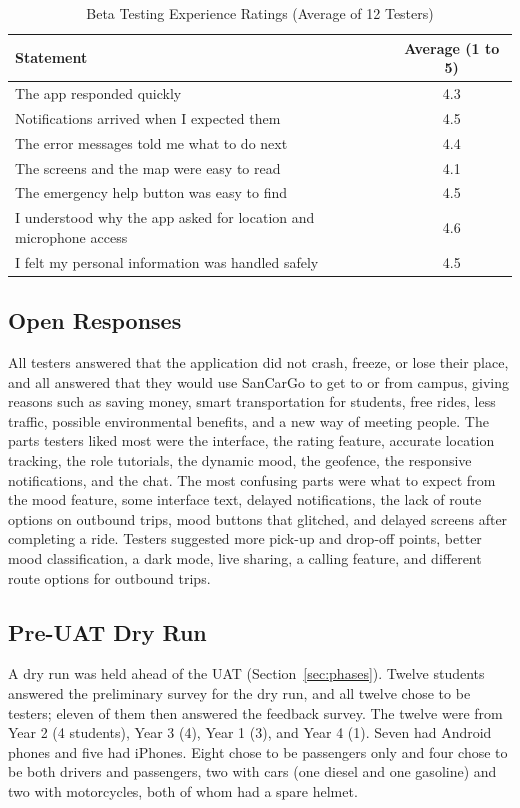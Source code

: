 \begin{table}[htbp]
    \centering
    \caption{Beta Testing Experience Ratings (Average of 12 Testers)}
    \label{tab:beta-ratings}
    \small
    \renewcommand{\arraystretch}{1.2}
    \begin{tabular}{|l|c|}
        \hline
        \textbf{Statement} & \textbf{Average (1 to 5)} \\
        \hline
        The app responded quickly & 4.3 \\
        Notifications arrived when I expected them & 4.5 \\
        The error messages told me what to do next & 4.4 \\
        The screens and the map were easy to read & 4.1 \\
        The emergency help button was easy to find & 4.5 \\
        I understood why the app asked for location and microphone access & 4.6 \\
        I felt my personal information was handled safely & 4.5 \\
        \hline
    \end{tabular}
\end{table}

\subsection{Open Responses}
All testers answered that the application did not crash, freeze, or lose their place, and all answered that they would use SanCarGo to get to or from campus, giving reasons such as saving money, smart transportation for students, free rides, less traffic, possible environmental benefits, and a new way of meeting people. The parts testers liked most were the interface, the rating feature, accurate location tracking, the role tutorials, the dynamic mood, the geofence, the responsive notifications, and the chat. The most confusing parts were what to expect from the mood feature, some interface text, delayed notifications, the lack of route options on outbound trips, mood buttons that glitched, and delayed screens after completing a ride. Testers suggested more pick-up and drop-off points, better mood classification, a dark mode, live sharing, a calling feature, and different route options for outbound trips.

\subsection{Pre-UAT Dry Run}
A dry run was held ahead of the UAT (Section~\ref{sec:phases}). Twelve students answered the preliminary survey for the dry run, and all twelve chose to be testers; eleven of them then answered the feedback survey. The twelve were from Year 2 (4 students), Year 3 (4), Year 1 (3), and Year 4 (1). Seven had Android phones and five had iPhones. Eight chose to be passengers only and four chose to be both drivers and passengers, two with cars (one diesel and one gasoline) and two with motorcycles, both of whom had a spare helmet.

